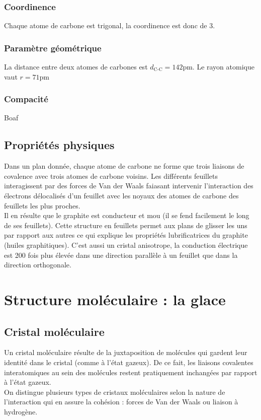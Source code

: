 \subsubsection{Coordinence}
Chaque atome de carbone est trigonal, la coordinence
est donc de 3.
\subsubsection{Paramètre géométrique}
La distance entre deux atomes de carbones est $d_\text{C-C} = 142$pm.
Le rayon atomique vaut $r = 71$pm
\subsubsection{Compacité}
Boaf

\subsection{Propriétés physiques}
Dans un plan donnée, chaque atome de carbone ne forme que trois
liaisons de covalence avec trois atomes de carbone voisins.
Les différents feuillets interagissent par des forces de Van der
Waals faiasant intervenir l'interaction des électrons délocalisés
d'un feuillet avec les noyaux des atomes de carbone des feuillets
les plus proches.\\
Il en résulte que le graphite est
conducteur et mou (il se fend facilement le long de ses feuillets).
Cette structure en feuillets permet aux plans de glisser les uns
par rapport aux autres ce qui explique les propriétés lubrificatrices
du graphite (huiles graphitiques). C'est aussi un cristal anisotrope,
la conduction électrique est 200 fois plus élevée dans une direction
parallèle à un feuillet que dans la direction orthogonale.


\section{Structure moléculaire : la glace}
\subsection*{Cristal moléculaire}
Un cristal moléculaire résulte de la juxtaposition de molécules
qui gardent leur identité dans le cristal (comme à l'état gazeux).
De ce fait, les liaisons covalentes interatomiques au sein des
molécules restent pratiquement inchangées par rapport à l'état
gazeux.\\
On distingue plusieurs types de cristaux moléculaires selon la
nature de l'interaction qui en assure la cohésion :
forces de Van der Waals ou liaison à hydrogène.

